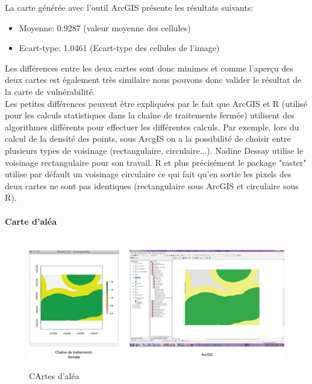 La carte générée avec l'outil ArcGIS présente les résultats suivants:

\begin{itemize}

\item Moyenne: 0.9287 (valeur moyenne des cellules)
\item Ecart-type: 1.0461 (Ecart-type des cellules de l'image)\\

\end{itemize} 

Les différences entre les deux cartes sont donc minimes et comme l'aperçu des deux cartes est également très similaire nous pouvons donc valider le résultat de la carte de vulnérabilité.\\

Les petites différences peuvent être expliquées par le fait que ArcGIS et R (utilisé pour les calculs statistiques dans la chaîne de traitements fermée) utilisent des algorithmes différents pour effectuer les différentes calculs. Par exemple, lors du calcul de la densité des points, sous ArcgIS on a la possibilité de choisir entre plusieurs types de voisinage (rectangulaire, circulaire...). Nadine Dessay utilise le voisinage rectangulaire pour son travail. R et plus précisément le package "raster" utilise par défault un voisinage circulaire ce qui fait qu'en sortie les pixels des deux cartes ne sont pas identiques (rectangulaire sous ArcGIS et circulaire sous R).


\paragraph{Carte d'aléa\\\\}

\begin{center}
\begin{figure}[h] \centering
\includegraphics[width=14cm]{AleaComp}\\
\caption{\label{AleaComp} CArtes d'aléa}
\end{figure}
\end{center}

